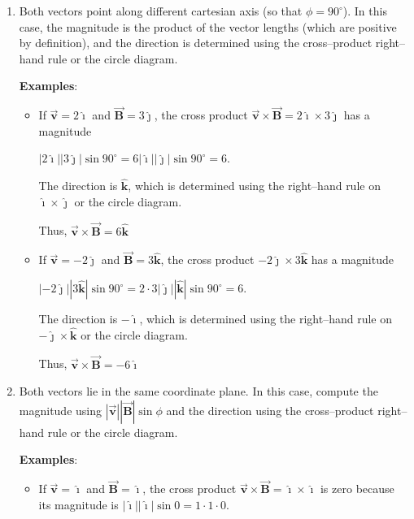 \documentclass{article}
\newcommand{\ihat}[0]{\hat{\boldsymbol{\imath}}}
\newcommand{\jhat}[0]{\hat{\boldsymbol{\jmath}}}
\newcommand{\khat}[0]{\hat{\boldsymbol{k}}}
\newcommand{\bfvec}[1]{\vec{\mathbf{#1}}}
\begin{document}
\begin{enumerate}

  \item Both vectors point along different cartesian axis (so that $\phi=90^\circ$). In this case, the magnitude is the product of the vector lengths (which are positive by definition), and the direction is determined using the cross--product right--hand rule or the circle diagram.

        \textbf{Examples}:

    \begin{itemize}

      \item If $\bfvec{v}=2\ihat$ and $\bfvec{B}=3\jhat$, the cross product $\bfvec{v}\times\bfvec{B}=2\ihat\times3\jhat$ has a magnitude

            $|2\ihat||3\jhat|\sin 90^\circ = 6|\ihat||\jhat|\sin 90^\circ = 6$.

            The direction is $\khat$, which is determined using the right--hand rule on $\ihat\times\jhat$ or the circle diagram.

            Thus, $\bfvec{v}\times\bfvec{B} = 6\khat$

      \item If $\bfvec{v}=-2\jhat$ and $\bfvec{B}=3\khat$, the cross product $-2\jhat\times3\khat$ has a magnitude

            $|-2\jhat||3\khat|\sin 90^\circ = 2\cdot 3|\jhat||\khat|\sin 90^\circ = 6$.

            The direction is $-\ihat$, which is determined using the right--hand rule on $-\jhat\times\khat$ or the circle diagram.

            Thus, $\bfvec{v}\times\bfvec{B}=-6\ihat$

    \end{itemize}

  \item Both vectors lie in the same coordinate plane. In this case, compute the magnitude using $|\bfvec{v}||\bfvec{B}|\sin\phi$ and the direction using the cross--product right--hand rule or the circle diagram.

        \textbf{Examples}:

      \begin{itemize}

        \item If $\bfvec{v}=\ihat$ and $\bfvec{B}=\ihat$, the cross product $\bfvec{v}\times\bfvec{B}=\ihat\times\ihat$ is zero because its magnitude is $|\ihat||\ihat|\sin 0 = 1\cdot 1 \cdot 0$.


\end{itemize}
\end{enumerate}
\end{document}
